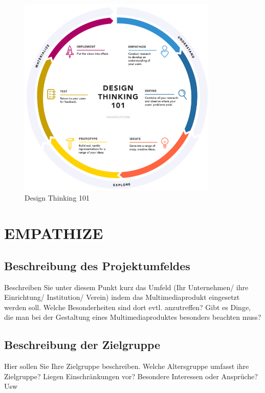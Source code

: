 
\begin{figure}[hbtp]
  \centering
  \includegraphics[width=0.85\textwidth]{res/design_thinking.png}
  \caption{Design Thinking 101 \citep[Quelle:][]{designthinking}}
  \label{fig:exintink}
\end{figure}

\section{EMPATHIZE}\label{EMPATHIZE}
\subsection{Beschreibung des Projektumfeldes}\label{Beschreibung des Projektumfeldes}
Beschreiben Sie unter diesem Punkt kurz das Umfeld (Ihr Unternehmen/ ihre Einrichtung/ Institution/ Verein) indem das Multimediaprodukt eingesetzt werden soll.
Welche Besonderheiten sind dort evtl. anzutreffen?
Gibt es Dinge, die man bei der Gestaltung eines Multimediaproduktes besonders beachten muss?

\subsection{Beschreibung der Zielgruppe}\label{Beschreibung der Zielgruppe}
Hier sollen Sie Ihre Zielgruppe beschreiben.
Welche Altersgruppe umfasst ihre Zielgruppe?
Liegen Einschränkungen vor?
Besondere Interessen oder Ansprüche?
Usw


